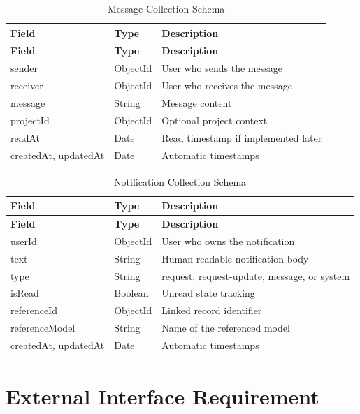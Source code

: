 \documentclass[12pt,a4paper,oneside]{report}
\begin{document}
{\small
\setlength{\tabcolsep}{4pt}
\begin{longtable}{L{1.1in}L{0.95in}L{2.75in}}
\caption{Message Collection Schema} \\
\toprule
\textbf{Field} & \textbf{Type} & \textbf{Description} \\
\midrule
\endfirsthead
\toprule
\textbf{Field} & \textbf{Type} & \textbf{Description} \\
\midrule
\endhead
sender & ObjectId & User who sends the message \\
receiver & ObjectId & User who receives the message \\
message & String & Message content \\
projectId & ObjectId & Optional project context \\
readAt & Date & Read timestamp if implemented later \\
createdAt, updatedAt & Date & Automatic timestamps \\
\bottomrule
\end{longtable}
}

{\small
\setlength{\tabcolsep}{4pt}
\begin{longtable}{L{1.1in}L{0.95in}L{2.75in}}
\caption{Notification Collection Schema} \\
\toprule
\textbf{Field} & \textbf{Type} & \textbf{Description} \\
\midrule
\endfirsthead
\toprule
\textbf{Field} & \textbf{Type} & \textbf{Description} \\
\midrule
\endhead
userId & ObjectId & User who owns the notification \\
text & String & Human-readable notification body \\
type & String & request, request-update, message, or system \\
isRead & Boolean & Unread state tracking \\
referenceId & ObjectId & Linked record identifier \\
referenceModel & String & Name of the referenced model \\
createdAt, updatedAt & Date & Automatic timestamps \\
\bottomrule
\end{longtable}
}

\section{External Interface Requirement}
\end{document}
